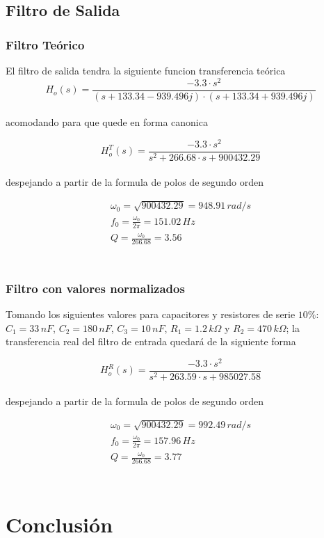 \documentclass[10pt,a4paper]{article}
\begin{document}
    \subsection{Filtro de Salida}\label{subsec:filtro-de-salida}

    \subsubsection{Filtro Teórico}
    El filtro de salida tendra la siguiente funcion transferencia teórica \\

    \[H_o(s)= \frac{-3.3 \cdot s^{2}}{(s +133.34 -939.496j) \cdot (s + 133.34 +939.496j)}\] \\

    acomodando para que quede en forma canonica

    \[H_{o}^{T}(s)=  \frac{-3.3 \cdot s^{2}}{s^{2}+266.68\cdot s + 900432.29}\] \\

    despejando a partir de la formula de polos de segundo orden

    \begin{gather*}
        \omega_{0}= \sqrt{900432.29} = 948.91 \, rad/s\\
        f_{0}= \frac{\omega_{0}}{2\pi} = 151.02 \, Hz\\
        Q= \frac{\omega_{0}}{266.68} = 3.56\\
    \end{gather*} \\

    \subsubsection{Filtro con valores normalizados}

    Tomando los siguientes valores para capacitores y resistores de serie $10\%$:
    $C_{1} = 33 \, nF$, $C_{2} = 180 \, nF$, $C_{3} = 10 \, nF$, $R_{1} = 1.2 \, k\Omega$ y $R_{2} = 470 \, k\Omega$; la transferencia real del filtro de entrada quedará de la siguiente forma

    \[H_{o}^{R}(s)=  \frac{-3.3 \cdot s^{2}}{s^{2}+263.59 \cdot s + 985027.58}\] \\

    despejando a partir de la formula de polos de segundo orden

    \begin{gather*}
        \omega_{0}= \sqrt{900432.29} = 992.49 \, rad/s\\
        f_{0}= \frac{\omega_{0}}{2\pi} = 157.96 \, Hz\\
        Q= \frac{\omega_{0}}{266.68} = 3.77\\
    \end{gather*} \\

    \section{Conclusión}\label{sec:conclusión}
\end{document}
